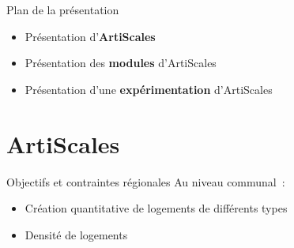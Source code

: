 \documentclass[xcolor=table]{beamer}
\begin{document}




\begin{frame}{Plan de la présentation}
	\begin{itemize}
		\item Présentation d'\textbf{ArtiScales}
		\item Présentation des \textbf{modules} d'ArtiScales
		\item Présentation d'une \textbf{expérimentation} d'ArtiScales
	\end{itemize}
\end{frame}




\section{ArtiScales}

\begin{frame}{Objectifs et contraintes régionales}
Au niveau communal~:
\begin{itemize}
	\item Création quantitative de logements de différents types
	\item Densité de logements
\end{itemize}
\end{frame}
\end{document}
